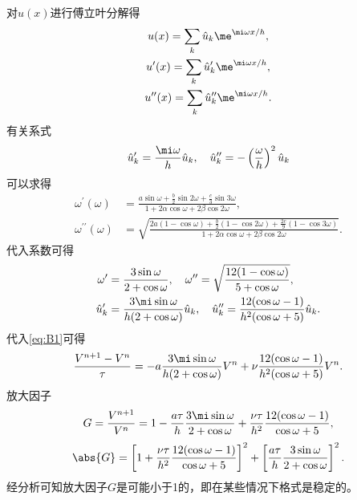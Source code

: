 \documentclass[12pt]{article}
\begin{document}
对$u(x)$进行傅立叶分解得
\begin{gather}
	u(x)=\sum_k \hat{u}_k \me^{\mi \omega {x}/{h}},\\
	u^{\prime}(x)=\sum_{k} \hat{u}_{k}^{\prime} \me^{\mi \omega x / h}, \\
	u^{\prime \prime}(x)=\sum_{k} \hat{u}_{k}^{\prime \prime} \me^{ \mi \omega x / h}.
\end{gather}
有关系式
\begin{equation}
	\hat{u}_{k}^{\prime}=\frac{\mi \omega}{h} \hat{u}_{k}, \quad \hat{u}_{k}^{\prime \prime}=-\left(\frac{\omega}{h}\right)^{2} \hat{u}_{k}
\end{equation}
可以求得
\begin{align}
	\omega^{\prime}(\omega)        & =\frac{a \sin \omega+\frac{b}{2} \sin 2 \omega+\frac{c}{3} \sin 3 \omega}{1+2 \alpha \cos \omega+2 \beta \cos 2 \omega},                     \\
	\omega^{\prime \prime}(\omega) & =\sqrt{\frac{2 a(1-\cos \omega)+\frac{b}{2}(1-\cos 2 \omega)+\frac{2 c}{9}(1-\cos 3 \omega)}{1+2 \alpha \cos \omega+2 \beta \cos 2 \omega}}.
\end{align}
代入系数可得
\begin{align}
	\omega^{\prime}      & =\frac{3 \sin \omega}{2+ \cos \omega}, \quad \omega^{\prime \prime}=\sqrt{\frac{12(1-\cos \omega)}{5+\cos \omega}},                        \\
	\hat{u}_{k}^{\prime} & =\frac{3 \mi \sin \omega}{h(2+ \cos \omega)} \hat{u}_{k}, \quad \hat{u}''_{k}=\frac{12(\cos \omega-1)}{ h^{2}(\cos \omega+5)} \hat{u}_{k}.
\end{align}
代入\cref{eq:B1}可得
\begin{equation}
	\frac{V^{n+1}-V^{n}}{\tau} = -a \frac{3 \mi \sin \omega}{h(2+ \cos \omega)} V^{n} + \nu \frac{12(\cos \omega-1)}{ h^{2}(\cos \omega+5)}  V^{n}.
\end{equation}
放大因子
\begin{equation}
	G = \frac{V^{n+1}}{V^n} = 1 - \frac{a\tau}{h}\frac{3 \mi \sin \omega}{2+ \cos \omega} + \frac{\nu\tau}{h^2}\frac{12(\cos \omega-1)}{ \cos \omega+5},
\end{equation}
\begin{equation}
	\abs{G} = \left[ 1+\frac{\nu\tau}{h^2}\frac{12(\cos \omega-1)}{ \cos \omega+5} \right]^2+\left[ \frac{a\tau}{h}\frac{3 \sin \omega}{2+ \cos \omega} \right]^2.
\end{equation}
经分析可知放大因子$G$是可能小于1的，即在某些情况下格式是稳定的。








\end{document}
